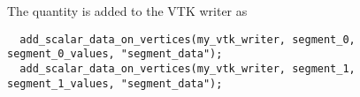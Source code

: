  \pagebreak
 
 The quantity is added to the VTK writer as
 \begin{lstlisting}
  add_scalar_data_on_vertices(my_vtk_writer, segment_0, segment_0_values, "segment_data");
  add_scalar_data_on_vertices(my_vtk_writer, segment_1, segment_1_values, "segment_data");
 \end{lstlisting}

